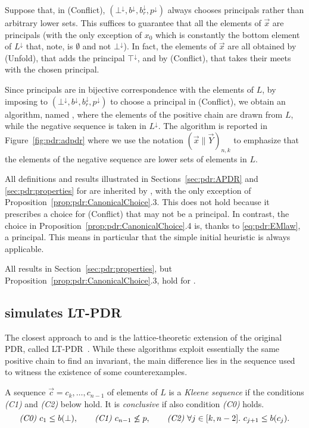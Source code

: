 Suppose that, in (Conflict), {\APDR}$(\bot^\downarrow, b^\downarrow,b_r^{\downarrow}, p^{\downarrow})$ always chooses principals rather than arbitrary lower sets. This suffices to guarantee that all the elements of $\vec{x}$ are principals (with the only exception of $x_0$ which is constantly the bottom element of $L^\downarrow$ that, note, is $\emptyset$ and not $\bot^\downarrow$). In fact, the elements of $\vec{x}$ are all obtained by (Unfold), that adds the principal $\top^\downarrow$, and by (Conflict), that  takes their meets with the chosen principal.

Since principals are in bijective correspondence with the elements of $L$, by imposing to {\APDR}$(\bot^\downarrow, b^\downarrow,b_r^{\downarrow}, p^{\downarrow})$ to choose  a principal in (Conflict), we obtain an algorithm, named {\ADPDR}, where the elements of the positive chain are drawn from $L$, while the negative sequence is taken in $L^{\downarrow}$. The algorithm is reported in Figure~\ref{fig:pdr:adpdr} where we use the notation $( \vec{x} \| \vec{Y} )_{n,k}$ to emphasize that the elements of the negative sequence are lower sets of elements in $L$.

All definitions and results illustrated in Sections~\ref{sec:pdr:APDR} and \ref{sec:pdr:properties} for {\APDR}  are inherited by {\ADPDR}, with the only exception of Proposition~\ref{prop:pdr:CanonicalChoice}.3. This does not hold because it prescribes a choice for (Conflict) that may not be a principal. In contrast, the choice in Proposition~\ref{prop:pdr:CanonicalChoice}.4 is, thanks to \eqref{eq:pdr:EMlaw}, a principal. This means in particular that the simple initial heuristic is always applicable.

\begin{theorem}\label{th:pdr:ADPDR}
	All results in Section~\ref{sec:pdr:properties}, but Proposition~\ref{prop:pdr:CanonicalChoice}.3, hold for \emph{\ADPDR}.
\end{theorem}

\subsection{{\ADPDR} simulates LT-PDR}\label{sec:pdr:LTPDRvsADPDR}
The closest approach to {\APDR} and {\ADPDR} is the lattice-theoretic extension of the original PDR, called LT-PDR~\cite{KUKSH22}. While these algorithms exploit essentially the same positive chain to find an invariant, the main difference lies in the sequence used to witness the existence of some counterexamples.
\begin{definition}
	A sequence $\vec{c}= c_k,\dots, c_{n-1}$ of elements of $L$ is a \emph{Kleene sequence} if the conditions \emph{(C1)} and \emph{(C2)} below hold.
	It is \emph{conclusive} if also condition \emph{(C0)} holds.
	\[
	\emph{(C0) } c_1 \le b(\bot),
	\qquad
	\emph{(C1) } c_{n-1} \not \le p,
	\qquad
	\emph{(C2) } \forall j\in[k,n-2].~c_{j+1} \le b(c_j)\text{.}
	\]
\end{definition}

